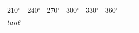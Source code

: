\begin{center}
\begin{xtabular*}{\mytablewidth}[t]{|p{10\mystarwidth}|p{10\mystarwidth}|p{10\mystarwidth}|p{10\mystarwidth}|p{10\mystarwidth}|p{10\mystarwidth}|p{10\mystarwidth}|p{10\mystarwidth}|}
        210${}^{\circ }$ &
        240${}^{\circ }$ &
        270${}^{\circ }$ &
        300${}^{\circ }$ &
        330${}^{\circ }$ &
        360${}^{\circ }$%
     \tabularnewline{}
                  $tan\theta $
                 &
         &
         &
         &
         &
         &

\end{xtabular*}
\end{center}

